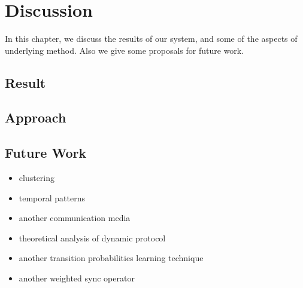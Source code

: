 \chapter{Discussion}
In this chapter, we discuss the results of our system, and some of the aspects of underlying method. Also we give some proposals for future work.
\section{Result}
\section{Approach}
\section{Future Work}
\begin{itemize}[noitemsep]
	\item clustering 
	\item temporal patterns 
	\item another communication media  
	\item theoretical analysis of dynamic protocol 
	\item another transition probabilities learning technique 
	\item another weighted sync operator
\end{itemize}